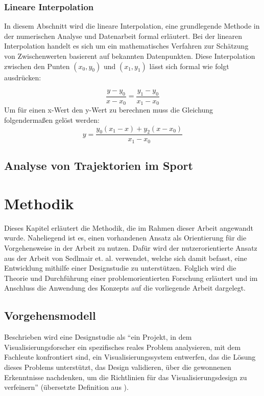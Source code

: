 \documentclass[
  ngerman,
  a4paper,  %
  twoside,  %
  bibliography=totoc,
  headsepline,
  cleardoublepage=empty,
  parskip=half,
  draft=false
]{scrbook}
\begin{document}
\subsection{Lineare Interpolation}
In diesem Abschnitt wird die lineare Interpolation, eine grundlegende Methode in der numerischen Analyse und Datenarbeit formal erläutert. Bei der linearen Interpolation handelt es sich um ein mathematisches Verfahren zur Schätzung von Zwischenwerten basierent auf bekannten Datenpunkten. Diese Interpolation zwischen den Punten $(x_0,y_0)$ und $(x_1,y_1)$ lässt sich formal wie folgt ausdrücken:

\begin{equation}
  \frac{y-y_0}{x-x_0}=\frac{y_1-y_0}{x_1-x_0}
\end{equation}
Um für einen x-Wert den y-Wert zu berechnen muss die Gleichung folgendermaßen gelöst werden:
\begin{equation}
  y=\frac{y_0(x_1-x)+y_2(x-x_0)}{x_1-x_0}
\end{equation}


\section{Analyse von Trajektorien im Sport}


\chapter{Methodik \label{chp:methodik}}
Dieses Kapitel erläutert die Methodik, die im Rahmen dieser Arbeit angewandt wurde. Naheliegend ist es, einen vorhandenen Ansatz als Orientierung für die Vorgehensweise in der Arbeit zu nutzen. Dafür wird der nutzerorientierte Ansatz aus der Arbeit von Sedlmair et. al. \cite{sedlmair_design_2012} verwendet, welche sich damit befasst, eine Entwicklung mithilfe einer Designstudie zu unterstützen. Folglich wird die Theorie und Durchführung einer problemorientierten Forschung erläutert und im Anschluss die Anwendung des Konzepts auf die vorliegende Arbeit dargelegt.
\section{Vorgehensmodell}

Beschrieben wird eine Designstudie als \enquote{ein Projekt, in dem Visualisierungsforscher ein spezifisches reales Problem analysieren, mit dem Fachleute konfrontiert sind, ein Visualisierungssystem entwerfen, das die Lösung dieses Problems unterstützt, das Design validieren, über die gewonnenen Erkenntnisse nachdenken, um die Richtlinien für das Visualisierungsdesign zu verfeinern} (übersetzte Definition aus \cite{sedlmair_design_2012}).
\end{document}
